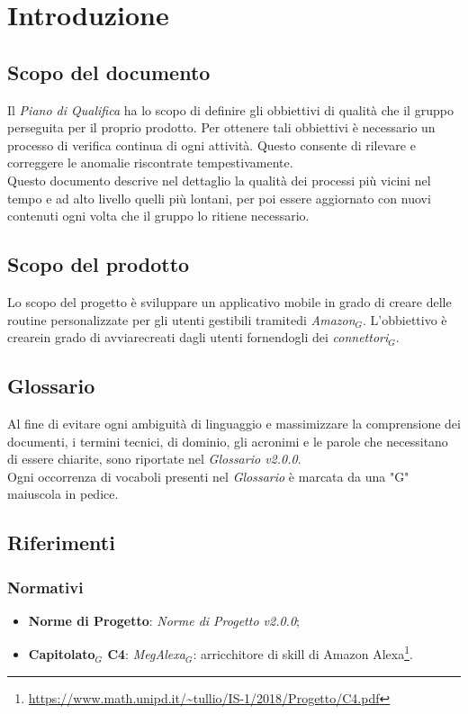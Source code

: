 \chapter{Introduzione}
\label{introduzione}
\section{Scopo del documento}
Il \textit{Piano di Qualifica} ha lo scopo di definire gli obbiettivi di qualità che il gruppo perseguita per il proprio prodotto. Per ottenere tali obbiettivi è necessario un processo di verifica continua di ogni attività. Questo consente di rilevare e correggere le anomalie riscontrate tempestivamente.\\
Questo documento descrive nel dettaglio la qualità dei processi più vicini nel tempo e ad alto livello quelli più lontani, per poi essere aggiornato con nuovi contenuti ogni volta che il gruppo lo ritiene necessario.
\section{Scopo del prodotto}
Lo scopo del progetto è sviluppare un applicativo mobile in grado di creare delle routine personalizzate per gli utenti gestibili tramitedi \textit{Amazon$_{G}$}. L'obbiettivo è crearein grado di avviarecreati dagli utenti fornendogli dei \textit{connettori$_{G}$}.
\section{Glossario}
Al fine di evitare ogni ambiguità di linguaggio e massimizzare la comprensione dei documenti, i termini tecnici, di dominio, gli acronimi e le parole che necessitano di essere chiarite, sono riportate nel \textit{Glossario v2.0.0}.\\
Ogni occorrenza di vocaboli presenti nel \textit{Glossario} è marcata da una "G" maiuscola in pedice.
\section{Riferimenti}
\subsection{Normativi}
\label{RiferimentiNormativi}
\begin{itemize}
	\item  \textbf{Norme di Progetto}: \textit{Norme di Progetto v2.0.0};
	\item \textbf{Capitolato$_{G}$ C4}: \textit{MegAlexa$_{G}$}: arricchitore di skill di Amazon Alexa\footnote{\url{https://www.math.unipd.it/~tullio/IS-1/2018/Progetto/C4.pdf}}.
\end{itemize}
